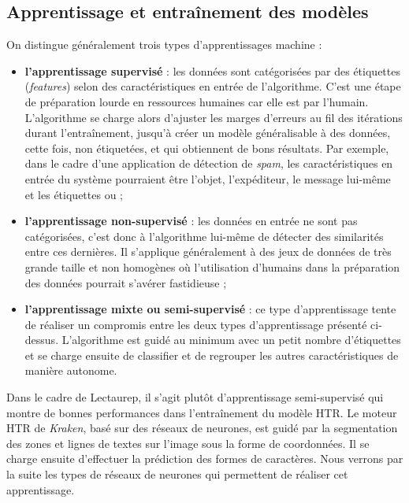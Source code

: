 \subsection{Apprentissage et entraînement des modèles}

On distingue généralement trois types d'apprentissages machine : 
\begin{itemize}
    \item \textbf{l'apprentissage supervisé} : les données sont catégorisées par des étiquettes (\textit{features}) selon des caractéristiques en entrée de l'algorithme. C'est une étape de préparation lourde en ressources humaines car elle est  par l'humain. L'algorithme se charge alors d'ajuster les marges d'erreurs au fil des itérations durant l'entraînement, jusqu'à créer un modèle généralisable à des données, cette fois, non étiquetées, et qui obtiennent de bons résultats. Par exemple, dans le cadre d'une application de détection de \textit{spam}, les caractéristiques en entrée du système pourraient être l'objet, l'expéditeur, le message lui-même et les étiquettes  ou  ;\\
    \item \textbf{l'apprentissage non-supervisé} : les données en entrée ne sont pas catégorisées, c'est donc à l'algorithme lui-même de détecter des similarités entre ces dernières. Il s'applique généralement à des jeux de données de très grande taille et non homogènes où l'utilisation d'humains dans la préparation des données pourrait s'avérer fastidieuse ;\\
    \item \textbf{l'apprentissage mixte ou semi-supervisé} : ce type d'apprentissage tente de réaliser un compromis entre les deux types d'apprentissage présenté ci-dessus. 
    L'algorithme est guidé au minimum avec un petit nombre d'étiquettes et se charge ensuite de classifier et de regrouper les autres caractéristiques de manière autonome.\\
\end{itemize}

Dans le cadre de Lectaurep, il s'agit plutôt d'apprentissage semi-supervisé qui montre de bonnes performances dans l'entraînement du modèle HTR. Le moteur HTR de \textit{Kraken}, basé sur des réseaux de neurones, est guidé par la segmentation des zones et lignes de textes sur l'image sous la forme de coordonnées. Il se charge ensuite d'effectuer la prédiction des formes de caractères. Nous verrons par la suite les types de réseaux de neurones qui permettent de réaliser cet apprentissage.
\newpage
